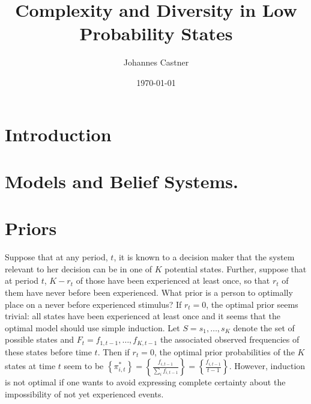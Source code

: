 \documentclass[11pt]{article}
\title{Complexity and Diversity in Low Probability States}
\author{Johannes Castner}
\date{\today}
\begin{document}
\maketitle

\setcounter{tocdepth}{3}
\tableofcontents
\vspace*{1cm}
\newpage

\begin{abstract} 

\end{abstract} 


\section{Introduction}

\section{Models and Belief Systems.}

\section{Priors}

Suppose that at any period, $t$, it is known to a decision maker that the system relevant to her decision can be in one of $K$ potential states.  Further, suppose that at period $t$, $K - r_t$ of those have been experienced at least once, so that $r_t$ of them have never before been experienced. What prior is a person to optimally place on a never before experienced stimulus? If $r_t=0$, the optimal prior seems trivial: all states have been experienced at least once and it seems that the optimal model should use simple induction. Let $S=s_1, \ldots, s_K$ denote the set of possible states and $F_t=f_{1, t-1}, \ldots, f_{K, t-1}$ the associated observed frequencies of these states before time $t$. Then if $r_t=0$, the optimal prior probabilities of the $K$ states at time $t$ seem to be $\left\{\pi_{i, t}^{*}\right\}=\left\{\frac{f_{i, t-1}}{\sum_i f_{i, t-1}}\right\}=\left\{\frac{f_{i, t-1}}{t-1}\right\}$. However, induction is not optimal if one wants to avoid expressing complete certainty about the impossibility of not yet experienced events. 
\\
\end{document}
